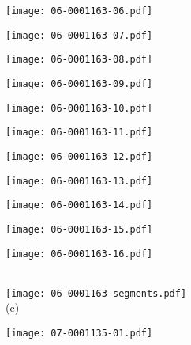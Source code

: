 \documentclass[10pt,twocolumn,letterpaper]{article}
\begin{document}
\begin{figure*}[t]
 \begin{minipage}{0.058\textwidth} \centering \texttt{[image: 06-0001163-06.pdf]} \end{minipage}
 \begin{minipage}{0.058\textwidth} \centering \texttt{[image: 06-0001163-07.pdf]} \end{minipage}
 \begin{minipage}{0.058\textwidth} \centering \texttt{[image: 06-0001163-08.pdf]} \end{minipage}
 \begin{minipage}{0.058\textwidth} \centering \texttt{[image: 06-0001163-09.pdf]} \end{minipage}
 \begin{minipage}{0.058\textwidth} \centering \texttt{[image: 06-0001163-10.pdf]} \end{minipage}
 \begin{minipage}{0.058\textwidth} \centering \texttt{[image: 06-0001163-11.pdf]} \end{minipage}
 \begin{minipage}{0.058\textwidth} \centering \texttt{[image: 06-0001163-12.pdf]} \end{minipage}
 \begin{minipage}{0.058\textwidth} \centering \texttt{[image: 06-0001163-13.pdf]} \end{minipage}
 \begin{minipage}{0.058\textwidth} \centering \texttt{[image: 06-0001163-14.pdf]} \end{minipage}
 \begin{minipage}{0.058\textwidth} \centering \texttt{[image: 06-0001163-15.pdf]} \end{minipage}
 \begin{minipage}{0.058\textwidth} \centering \texttt{[image: 06-0001163-16.pdf]} \end{minipage}
 \\ \vspace{2mm}
 \texttt{[image: 06-0001163-segments.pdf]}
 \\
 (c)
 \\ \vspace{2mm}
 \begin{minipage}{0.058\textwidth} \centering \texttt{[image: 07-0001135-01.pdf]} \end{minipage}

\end{figure*}
\end{document}
